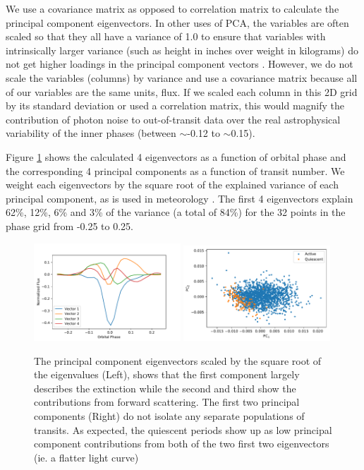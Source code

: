 \documentclass[preprint]{aastex61}
\begin{document}
We use a covariance matrix as opposed to correlation matrix to calculate the principal component eigenvectors.
In other uses of PCA, the variables are often scaled so that they all have a variance of 1.0 to ensure that variables with intrinsically larger variance (such as height in inches over weight in kilograms) do not get higher loadings in the principal component vectors \citep{jolliffe2002pca}.
However, we do not scale the variables (columns) by variance and use a covariance matrix because all of our variables are the same units, flux.
If we scaled each column in this 2D grid by its standard deviation or used a correlation matrix, this would magnify the contribution of photon noise to out-of-transit data over the real astrophysical variability of the inner phases (between $\sim$-0.12 to $\sim$0.15).

Figure \ref{fig:pcaVectorsComp} shows the calculated 4 eigenvectors as a function of orbital phase and the corresponding 4 principal components as a function of transit number.
We weight each eigenvectors by the square root of the explained variance of each principal component, as is used in meteorology \citep{richman1986pcaRotation}.
The first 4 eigenvectors explain 62\%, 12\%, 6\% and 3\% of the variance (a total of 84\%) for the 32 points in the phase grid from -0.25 to 0.25.

\begin{figure}[!hbtp]
\begin{centering}
\includegraphics[width=0.49\textwidth]{images/kepler/pca_k1255.pdf}
\includegraphics[width=0.49\textwidth]{images/kepler/pc1_pc2_acive_quiescent.pdf}
\caption{The principal component eigenvectors scaled by the square root of the eigenvalues (Left), shows that the first component largely describes the extinction while the second and third show the contributions from forward scattering.
The first two principal components (Right) do not isolate any separate populations of transits.
As expected, the quiescent periods show up as low principal component contributions from both of the two first two eigenvectors (ie. a flatter light curve)}\label{fig:pcaVectorsComp}
\end{centering}
\end{figure}
\end{document}
